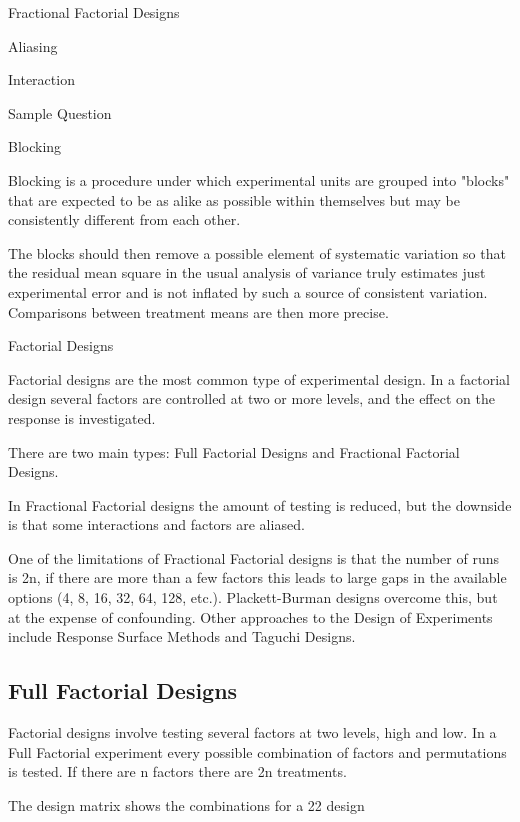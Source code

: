\documentclass[]{article}
\begin{document}
Fractional Factorial Designs

Aliasing

Interaction

Sample Question


Blocking


Blocking is a procedure under which experimental units are grouped into "blocks" that are expected to be as alike as possible within themselves but may be consistently different from each other. 


The blocks should then remove a possible element of systematic variation so that the residual mean square in the usual analysis of variance truly estimates just experimental error and is not inflated by such a source of consistent variation. Comparisons between treatment means are then more precise.


Factorial Designs


Factorial designs are the most common type of experimental design. In a factorial design several factors are controlled at two or more levels, and the effect on the response is investigated.

There are two main types: Full Factorial Designs and Fractional Factorial Designs. 


In Fractional Factorial designs the amount of testing is reduced, but the downside is that some interactions and factors are aliased. 


One of the limitations of Fractional Factorial designs is that the number of runs is 2n, if there are more than a few factors this leads to large gaps in the available options (4, 8, 16, 32, 64, 128, etc.). Plackett-Burman designs overcome this, but at the expense of confounding. Other approaches to the Design of Experiments include Response Surface Methods and Taguchi Designs.



\subsection{Full Factorial Designs}


Factorial designs involve testing several factors at two levels, high and low. In a Full Factorial experiment every possible combination of factors and permutations is tested. If there are n factors there are 2n treatments.



The design matrix shows the combinations for a 22 design
\end{document}
